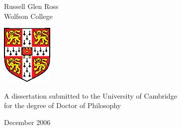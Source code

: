 
\begin{titlepage}
\begin{center}
\vspace*{\fill}

\huge
\thesistitlebig

\vfill
\vfill

\huge
Russell Glen Ross\\[6mm]
\large
Wolfson College

\vfill
\includegraphics[width=70pt]{figures/camshield}
\vfill

\large
A dissertation submitted to the University of Cambridge\\
for the degree of Doctor of Philosophy

\vfill

December 2006

\vspace*{\fill}
\end{center}
\end{titlepage}